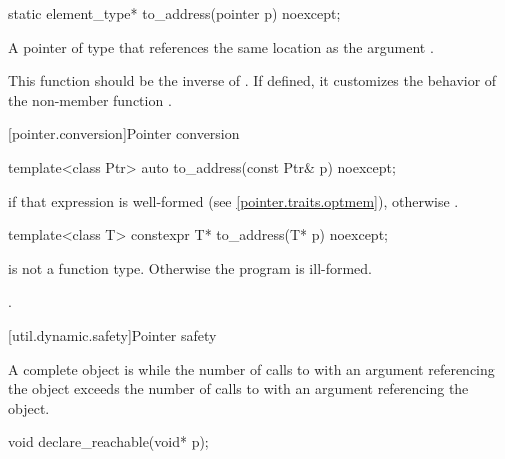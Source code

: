 %
\begin{itemdecl}
static element_type* to_address(pointer p) noexcept;
\end{itemdecl}

\begin{itemdescr}
\pnum
\returns
A pointer of type  that references
the same location as the argument .

\pnum
\begin{note}
This function should be the inverse of .
If defined, it customizes the behavior of
the non-member function
.
\end{note}
\end{itemdescr}

[pointer.conversion]{Pointer conversion}

%
\begin{itemdecl}
template<class Ptr> auto to_address(const Ptr& p) noexcept;
\end{itemdecl}

\begin{itemdescr}
\pnum
\returns
{} if that expression is well-formed
(see \ref{pointer.traits.optmem}),
otherwise .
\end{itemdescr}

%
\begin{itemdecl}
template<class T> constexpr T* to_address(T* p) noexcept;
\end{itemdecl}

\begin{itemdescr}
\pnum
\requires {} is not a function type. Otherwise the program is ill-formed.

\pnum
\returns {}.
\end{itemdescr}

[util.dynamic.safety]{Pointer safety}

\pnum
A complete object is  while the number of calls to
 with an argument referencing the object exceeds the
number of calls to  with an argument referencing the
object.

%
\begin{itemdecl}
void declare_reachable(void* p);
\end{itemdecl}


